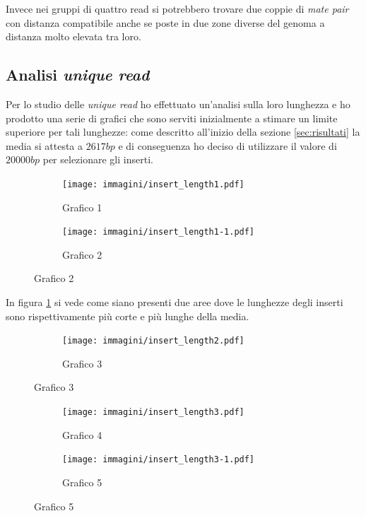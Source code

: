 Invece nei gruppi di quattro read si potrebbero trovare due coppie di \emph{mate pair} con distanza compatibile anche se poste in due zone diverse del genoma a distanza molto elevata tra loro.

\subsection{Analisi \emph{unique read}}
Per lo studio delle \emph{unique read} ho effettuato un'analisi sulla loro lunghezza e ho prodotto una serie di grafici che sono serviti inizialmente a stimare un limite superiore per tali lunghezze: come descritto all'inizio della sezione \ref{sec:risultati} la media si attesta a $2617bp$ e di conseguenza ho deciso di utilizzare il valore di $20000bp$ per selezionare gli inserti.

\begin{figure}[htbp]
\centering
	\begin{subfigure}[b]{.45\textwidth}
	\texttt{[image: immagini/insert\_length1.pdf]}
	\caption{Grafico 1}
	\label{fig:grafico 1}
	\end{subfigure}
	\quad
	\begin{subfigure}[b]{.45\textwidth}
		\texttt{[image: immagini/insert\_length1-1.pdf]}
		\caption{Grafico 2}
		\label{fig:grafico 2}
	\end{subfigure}
\end{figure}

In figura \ref{fig:grafico 1} si vede come siano presenti due aree dove le lunghezze degli inserti sono rispettivamente più corte e più lunghe della media.

\begin{figure}[htbp]
	\ContinuedFloat
	\centering
	\begin{subfigure}[b]{.45\textwidth}
		\texttt{[image: immagini/insert\_length2.pdf]}
		\caption{Grafico 3}
		\label{fig:grafico 3}
	\end{subfigure}
\end{figure}
\begin{figure}[htbp]
	\ContinuedFloat
	\centering
	\begin{subfigure}[b]{.45\textwidth}
		\texttt{[image: immagini/insert\_length3.pdf]}
		\caption{Grafico 4}
		\label{fig:grafico 4}
	\end{subfigure}
	\quad
	\begin{subfigure}[b]{.45\textwidth}
		\texttt{[image: immagini/insert\_length3-1.pdf]}
		\caption{Grafico 5}
		\label{fig:grafico 5}
	\end{subfigure}
\end{figure}

